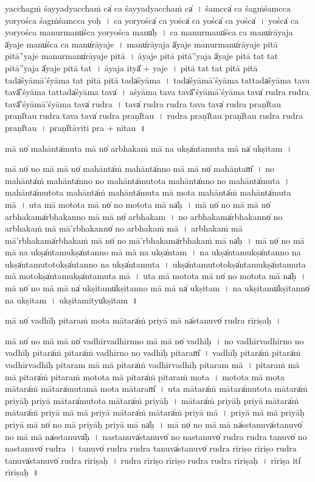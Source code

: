 \documentclass[parskip, DIV=14]{scrartcl}
\begin{document}
{yacchagṁ śayyadyacchaṁ ca̍ ca॒ śayyadyacchaṁ ca̍~।
śamcca̍ ca॒ śagṁśamcca॒ yoryośca॒ śagṁśamcca॒ yoḥ~। %
ca॒ yoryośca̍ ca॒ yośca̍ ca॒ yośca̍ ca॒ yośca̍~।
yośca̍ ca॒ yoryośca॒ manu॒rmanu̍śca॒ yoryośca॒ manu̍ḥ~।
ca॒ manu॒rmanu̍śca ca॒ manu̍rāya॒ja ā̍ya॒je manu̍śca ca॒ manu̍rāya॒je~।
manu̍rāya॒ja ā̍ya॒je manu॒rmanu̍rāya॒je pi॒tā pi॒tā''ya॒je manu॒rmanu̍rāya॒je pi॒tā~।
ā॒ya॒je pi॒tā pi॒tā''ya॒ja ā̍ya॒je pi॒tā tat tat pi॒tā''ya॒ja ā̍ya॒je pi॒tā tat~।
ā॒ya॒ja ityā̎ + ya॒je~।
pi॒tā tat tat pi॒tā pi॒tā tada̍śyāmā'śyāma॒ tat pi॒tā pi॒tā tada̍śyāma~। %
tada̍śyāmā'śyāma॒ tattada̍śyāma॒ tava॒ tavā̎'śyāma॒ tattada̍śyāma॒ tava̍~। %
a॒śyā॒ma॒ tava॒ tavā̎'śyāmā'śyāma॒ tava̍ rudra rudra॒ tavā̎'śyāmā'śyāma॒ tava̍ rudra~।
tava̍ rudra rudra॒ tava॒ tava̍ rudra॒ praṇī̍tau॒ praṇī̍tau rudra॒ tava॒ tava̍ rudra॒ praṇī̍tau~।
ru॒dra॒ praṇī̍tau॒ praṇī̍tau rudra rudra॒ praṇī̍tau~।
praṇī̍tā॒viti॒ pra + nī॒tau॒~॥ 


mā no̍ ma॒hānta̍mu॒ta mā no̍ arbha॒kaṁ mā na॒ ukṣa̍ntamu॒ta mā na̍ ukṣi॒tam~।

mā no̍ no॒ mā mā no̍ ma॒hānta̍ṁ ma॒hānta̍nno॒ mā mā no̍ ma॒hāntam̎~।
no॒ ma॒hānta̍ṁ ma॒hānta̍nno  no ma॒hānta̍mu॒tota ma॒hānta̍nno  no ma॒hānta̍mu॒ta~।
ma॒hānta̍mu॒tota ma॒hānta̍ṁ ma॒hānta̍mu॒ta mā mota ma॒hānta̍ṁ ma॒hānta̍mu॒ta mā~।
u॒ta mā motota mā no̍ no॒ motota mā na̍ḥ~।
mā no̍ no॒ mā mā no̍ arbha॒kama̍rbha॒kanno॒ mā mā no̍ arbha॒kam~।
no॒ a॒rbha॒kama̍rbha॒kanno̍ no arbha॒kaṁ mā mā'rbha॒kanno̍ no arbha॒kaṁ mā~।
a॒rbha॒kaṁ mā mā'rbha॒kama̍rbha॒kaṁ mā no̍ no॒ mā'rbha॒kama̍rbha॒kaṁ mā na̍ḥ~।
mā no̍ no॒ mā mā na॒ ukṣa̍nta॒mukṣa̍ntanno॒ mā mā na॒ ukṣa̍ntam~।
na॒ ukṣa̍nta॒mukṣa̍ntanno na॒ ukṣa̍ntamu॒totokṣa̍ntanno na॒ ukṣa̍ntamu॒ta~।
ukṣa̍ntamu॒totokṣa̍nta॒mukṣa̍ntamu॒ta mā motokṣa̍nta॒mukṣa̍ntamu॒ta mā~।
u॒ta mā motota mā no̍ no॒ motota mā na̍ḥ~।
mā no̍ no॒ mā mā na̍ ukṣi॒tamu̍kṣi॒tanno॒ mā mā na̍ ukṣi॒tam~।
na॒ u॒kṣi॒tamu̍kṣi॒tanno̍ na ukṣi॒tam~।
u॒kṣi॒tamityu̍kṣi॒tam~॥ %

mā no̍ vadhīḥ pi॒taraṁ mota mā॒tara̍ṁ pri॒yā mā na̍sta॒nuvo̍ rudra rīriṣaḥ~।

mā no̍ no॒ mā mā no̍ vadhīrvadhīrnno॒ mā mā no̍ vadhīḥ~।
no॒ va॒dhī॒rva॒dhī॒rno॒ no॒ va॒dhī॒ḥ॒ pi॒tara̍ṁ pi॒tara̍ṁ vadhīrno no vadhīḥ pi॒taram̎~। %
va॒dhī॒ḥ pi॒tara̍ṁ pi॒tara̍ṁ vadhīrvadhīḥ pi॒tara॒m mā mā pi॒tara̍ṁ vadhīrvadhīḥ pi॒tara॒m mā~।
pi॒tara॒ṁ mā mā pi॒tara̍ṁ pi॒tara॒ṁ motota mā pi॒tara̍ṁ pi॒tara॒ṁ mota~।
motota mā mota mā॒tara̍ṁ mā॒tara̍mu॒tamā mota mā॒taram̎~।
u॒ta mā॒tara̍ṁ mā॒tara̍mu॒tota mā॒tara̍ṁ pri॒yāḥ pri॒yā mā॒tara̍mu॒tota mā॒tara̍ṁ pri॒yāḥ~।
mā॒tara̍ṁ pri॒yāḥ pri॒yā mā॒tara̍ṁ mā॒tara̍ṁ pri॒yā mā mā pri॒yā mā॒tara̍ṁ mā॒tara̍ṁ pri॒yā mā~।
pri॒yā mā mā pri॒yāḥ pri॒yā mā no̍ no॒ mā pri॒yāḥ pri॒yā mā na̍ḥ~।
mā no̍ no॒ mā mā na̍ssta॒nuva̍sta॒nuvo̍ no॒ mā mā na̍ssta॒nuva̍ḥ~।
na॒sta॒nuva̍sta॒nuvo̍ no nasta॒nuvo̍ rudra rudra ta॒nuvo̍ no nasta॒nuvo̍ rudra~।
ta॒nuvo̍ rudra rudra ta॒nuva̍sta॒nuvo̍ rudra rīriṣo rīriṣo rudra ta॒nuva̍sta॒nuvo̍ rudra rīriṣaḥ~।
ru॒dra॒ rī॒ri॒ṣo॒ rī॒ri॒ṣo॒ ru॒dra॒ ru॒dra॒ rī॒ri॒ṣa॒ḥ॒~।
rī॒ri॒ṣa॒ iti̍ rīriṣaḥ~॥

}
\end{document}

